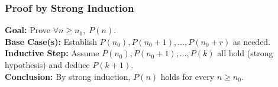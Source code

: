 \documentclass[5pt]{article}
\begin{document}
\begin{multicols}{2}
\subsubsection{Proof by Strong Induction}
\textbf{Goal:} Prove $\forall n\ge n_0,\;P(n)$.\\
\textbf{Base Case(s):} Establish $P(n_0),P(n_0+1),\dots,P(n_0+r)$ as needed.\\
\textbf{Inductive Step:} Assume $P(n_0),P(n_0+1),\dots,P(k)$ all hold (strong hypothesis) and deduce $P(k+1)$.\\
\textbf{Conclusion:} By strong induction, $P(n)$ holds for every $n\ge n_0$.\\

\end{multicols}
\end{document}
